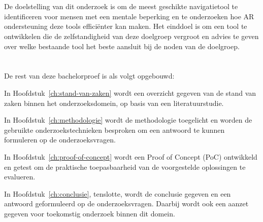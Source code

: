 \section{}%
\label{sec:onderzoeksdoelstelling}

De doelstelling van dit onderzoek is om de meest geschikte navigatietool te identificeren voor mensen met een mentale beperking en te onderzoeken hoe AR ondersteuning deze tools efficiënter kan maken. Het einddoel is om een tool te ontwikkelen die de zelfstandigheid van deze doelgroep vergroot en advies te geven over welke bestaande tool het beste aansluit bij de noden van de doelgroep.

\section{}%
\label{sec:opzet-bachelorproef}

De rest van deze bachelorproef is als volgt opgebouwd:

In Hoofdstuk~\ref{ch:stand-van-zaken} wordt een overzicht gegeven van de stand van zaken binnen het onderzoeksdomein, op basis van een literatuurstudie.

In Hoofdstuk~\ref{ch:methodologie} wordt de methodologie toegelicht en worden de gebruikte onderzoekstechnieken besproken om een antwoord te kunnen formuleren op de onderzoeksvragen.

In Hoofdstuk~\ref{ch:proof-of-concept} wordt een Proof of Concept (PoC) ontwikkeld en getest om de praktische toepasbaarheid van de voorgestelde oplossingen te evalueren.

In Hoofdstuk~\ref{ch:conclusie}, tenslotte, wordt de conclusie gegeven en een antwoord geformuleerd op de onderzoeksvragen. Daarbij wordt ook een aanzet gegeven voor toekomstig onderzoek binnen dit domein.
